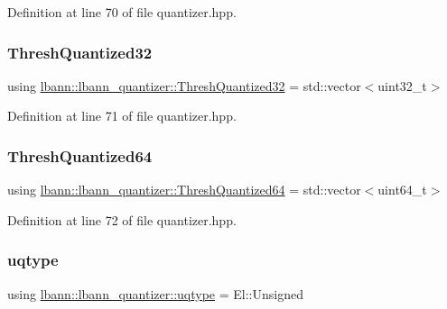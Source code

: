 Definition at line 70 of file quantizer.\+hpp.

\mbox{\label{classlbann_1_1lbann__quantizer_adb72778971f6bb914a14823dd5806702}} 
\subsubsection{\texorpdfstring{Thresh\+Quantized32}{ThreshQuantized32}}
{\footnotesize\ttfamily using \hyperlink{classlbann_1_1lbann__quantizer_adb72778971f6bb914a14823dd5806702}{lbann\+::lbann\+\_\+quantizer\+::\+Thresh\+Quantized32} =  std\+::vector$<$uint32\+\_\+t$>$}



Definition at line 71 of file quantizer.\+hpp.

\mbox{\label{classlbann_1_1lbann__quantizer_a2153502c89432e8762141d84794aac75}} 
\subsubsection{\texorpdfstring{Thresh\+Quantized64}{ThreshQuantized64}}
{\footnotesize\ttfamily using \hyperlink{classlbann_1_1lbann__quantizer_a2153502c89432e8762141d84794aac75}{lbann\+::lbann\+\_\+quantizer\+::\+Thresh\+Quantized64} =  std\+::vector$<$uint64\+\_\+t$>$}



Definition at line 72 of file quantizer.\+hpp.

\mbox{\label{classlbann_1_1lbann__quantizer_ac8b63c86fc871e248ce20c7af19a7fad}} 
\subsubsection{\texorpdfstring{uqtype}{uqtype}}
{\footnotesize\ttfamily using \hyperlink{classlbann_1_1lbann__quantizer_ac8b63c86fc871e248ce20c7af19a7fad}{lbann\+::lbann\+\_\+quantizer\+::uqtype} =  El\+::\+Unsigned}

